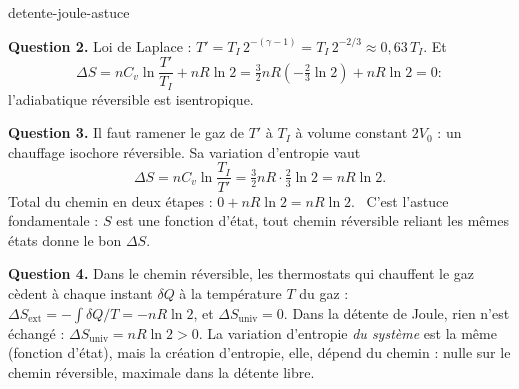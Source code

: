 \begin{exo}{detente-joule-astuce}
\begin{solution}
\textbf{Question 2.} Loi de Laplace : $T' = T_I\,2^{-(\gamma-1)} = T_I\,2^{-2/3} \approx 0{,}63\,T_I$. Et
\[
\Delta S = nC_v\ln\frac{T'}{T_I} + nR\ln 2 = \tfrac{3}{2}nR\left(-\tfrac{2}{3}\ln 2\right) + nR\ln 2 = 0 :
\]
l'adiabatique réversible est isentropique.

\textbf{Question 3.} Il faut ramener le gaz de $T'$ à $T_I$ à volume constant $2V_0$ : un chauffage isochore réversible. Sa variation d'entropie vaut
\[
\Delta S = nC_v\ln\frac{T_I}{T'} = \tfrac{3}{2}nR\cdot\tfrac{2}{3}\ln 2 = nR\ln 2.
\]
Total du chemin en deux étapes : $0 + nR\ln 2 = nR\ln 2$. \checkmark\ C'est l'astuce fondamentale : $S$ est une fonction d'état, tout chemin réversible reliant les mêmes états donne le bon $\Delta S$.

\textbf{Question 4.} Dans le chemin réversible, les thermostats qui chauffent le gaz cèdent à chaque instant $\delta Q$ à la température $T$ du gaz : $\Delta S_{\text{ext}} = -\int\delta Q/T = -nR\ln 2$, et $\Delta S_{\text{univ}} = 0$. Dans la détente de Joule, rien n'est échangé : $\Delta S_{\text{univ}} = nR\ln 2 > 0$. La variation d'entropie \emph{du système} est la même (fonction d'état), mais la création d'entropie, elle, dépend du chemin : nulle sur le chemin réversible, maximale dans la détente libre.
\end{solution}
\end{exo}

